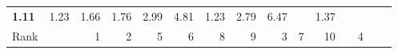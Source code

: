 \begin{tabular}{ll|rrrrrr|rrrrrrr}
  


  
  \textbf{1.11} & 1.23 & 1.66 & 1.76 & 2.99 & 4.81 & 1.23 & 2.79 & 6.47 &  & 1.37 \\

  Rank & &
  1 & 2 & 5 & 6 & 8 & 9 & 3 & 7 & 10 &  & 4 \\\hline\hline
  

\end{tabular}
